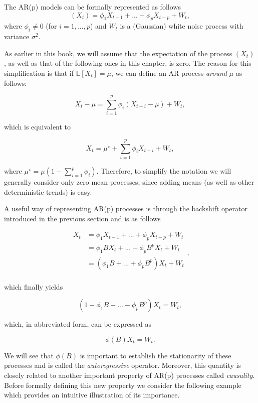 \documentclass[]{book}
\theoremstyle{definition}
\theoremstyle{definition}
\theoremstyle{definition}
\theoremstyle{remark}
\let\BeginKnitrBlock\begin \let\EndKnitrBlock\end
\begin{document}
\BeginKnitrBlock{definition}[Autoregressive Models of Order p]
\protect\hypertarget{def:arp}{}{\label{def:arp} {} }The AR(p) models can be formally represented
as follows
\[(X_t) = {\phi_1}{X_{t - 1}} + ... + {\phi_p}{X_{t - p}} + {W_t},\]
where \(\phi_i \neq 0\) (for \(i = 1, ..., p\)) and \(W_t\) is a
(Gaussian) white noise process with variance \(\sigma^2\).
\EndKnitrBlock{definition}

As earlier in this book, we will assume that the expectation of the
process \(({X_t})\), as well as that of the following ones in this
chapter, is zero. The reason for this simplification is that if
\(\mathbb{E} [ X_t ] = \mu\), we can define an AR process \emph{around}
\(\mu\) as follows:

\[X_t - \mu = \sum_{i = 1}^p \phi_i \left(X_{t-i} - \mu \right) + W_t,\]

which is equivalent to

\[X_t  = \mu^{\star} +  \sum_{i = 1}^p \phi_i X_{t-i}  + W_t,\]

where \(\mu^{\star} = \mu (1 - \sum_{i = 1}^p \phi_i)\). Therefore, to
simplify the notation we will generally consider only zero mean
processes, since adding means (as well as other deterministic trends) is
easy.

A useful way of representing AR(p) processes is through the backshift
operator introduced in the previous section and is as follows

\[\begin{aligned}
  {X_t} &= {\phi_1}{X_{t - 1}} + ... + {\phi_p}{X_{t - p}} + {W_t} \\
   &= {\phi_1}B{X_t} + ... + {\phi_p}B^p{X_t} + {W_t} \\
   &= ({\phi_1}B + ... + {\phi_p}B^p){X_t} + {W_t} \\ 
\end{aligned},\]

which finally yields

\[(1 - {\phi _1}B - ... - {\phi_p}B^p){X_t} = {W_t},\]

which, in abbreviated form, can be expressed as

\[\phi(B){X_t} = W_t.\]

We will see that \(\phi(B)\) is important to establish the stationarity
of these processes and is called the \emph{autoregressive} operator.
Moreover, this quantity is closely related to another important property
of AR(p) processes called \emph{causality}. Before formally defining
this new property we consider the following example which provides an
intuitive illustration of its importance.
\end{document}
